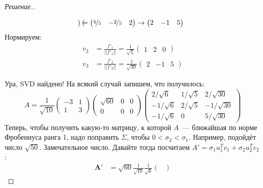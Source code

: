 \documentclass[a4paper]{article}
\theoremstyle{remark}
\begin{document}
\begin{proof}[Решение.]
\begin{enumerate}
\begin{align*}
\begin{pmatrix}
              \end{pmatrix} = \begin{pmatrix}
                \nicefrac{4}{5} & -\nicefrac{2}{5} & 2 
              \end{pmatrix} \to \begin{pmatrix}
                2 & -1 & 5
              \end{pmatrix}
            \end{align*}
            Нормируем:
            \begin{align*}
              v_2 &= \frac{f'_1}{|| f'_1 ||} = \frac{1}{\sqrt{5}}\begin{pmatrix}
                1 & 2 & 0
              \end{pmatrix} \\
              v_3 &= \frac{f'_2}{||f'_2||} = \frac{1}{\sqrt{30}}\begin{pmatrix}
                2 & -1 & 5
              \end{pmatrix}
            \end{align*}
          \end{enumerate}
          Ура, SVD найдено! На всякий случай запишем, что получилось:
          \begin{equation*}
            A = \frac{1}{\sqrt{10}} \begin{pmatrix}
              -3 & 1 \\
              1 & 3
            \end{pmatrix} \begin{pmatrix}
              \sqrt{60} & 0 & 0\\
              0 & 0 & 0
            \end{pmatrix} \begin{pmatrix}
              2/\sqrt{6} & 1/\sqrt{5} & 2/\sqrt{30} \\
              -1/\sqrt{6} & 2/\sqrt{5} &-1/\sqrt{30} \\
              -1/\sqrt{6} & 0 & 5/\sqrt{30}
            \end{pmatrix}
          \end{equation*}
          Теперь, чтобы получить какую-то матрицу, к которой $A$~--- ближайшая по норме Фробениуса ранга 1, надо поправить $\Sigma$, чтобы $0 < \sigma_2 < \sigma_1$. Например, подойдёт число $\sqrt{50}$. Замечательное число. Давайте тогда посчитаем  $A' = \sigma_1u_1^Tv_1 + \sigma_2 u_2^T v_2$:
          \begin{align*}
            \bm{A'} &\bm{=} \sqrt{60} \frac{1}{\sqrt{10}} \frac{1}{\sqrt{6}} \begin{pmatrix}

\end{pmatrix}
\end{align*}
\end{proof}
\end{document}
